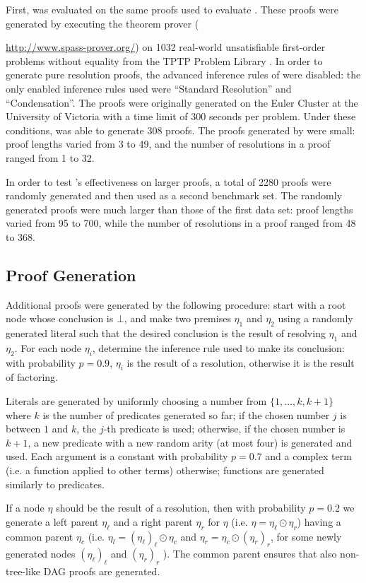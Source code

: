 First, {\FORPI} was evaluated on the same proofs used to evaluate {\GFOLU}. These proofs were generated by executing the {\SPASS} theorem prover ({\url{http://www.spass-prover.org/}) on 1032 real-world unsatisfiable first-order problems without equality from the TPTP Problem Library \cite{TPTP}. In order to generate pure resolution proofs, the advanced inference rules of {\SPASS} were disabled: the only enabled inference rules used were ``Standard Resolution'' and ``Condensation''. The proofs were originally generated on the Euler Cluster at the University of Victoria with a time limit of 300 seconds per problem. Under these conditions, {\SPASS} was able to generate 308 proofs. The proofs generated by {\SPASS} were small: proof lengths varied from 3 to 49, and the number of resolutions in a proof ranged from 1 to 32.



In order to test {\FORPI}'s effectiveness on larger proofs, a total of 2280 proofs were randomly generated and then used as a second benchmark set. The randomly generated proofs were much larger than those of the first data set: proof lengths varied from 95 to 700, while the number of resolutions in a proof ranged from 48 to 368.

\subsection{Proof Generation}
Additional proofs were generated by the following procedure: start with a root node whose conclusion is $\bot$, and make two premises $\eta_1$ and $\eta_2$ using a randomly generated literal such that the desired conclusion is the result of resolving $\eta_1$ and $\eta_2$. For each node $\eta_i$, determine the inference rule used to make its conclusion: with probability $p=0.9$, $\eta_i$ is the result of a resolution, otherwise it is the result of  factoring. 

Literals are generated by uniformly choosing a number from $\{1,\dots,k,k+1\}$ where $k$ is the number of predicates generated so far; if the chosen number $j$ is between $1$ and $k$, the $j$-th predicate is used; otherwise, if the chosen number is $k+1$, a new predicate with a new random arity (at most four) is generated and used. Each argument is a constant with probability $p=0.7$ and a complex term (i.e. a function applied to other terms) otherwise; functions are generated similarly to predicates. 

If a node $\eta$ should be the result of a resolution, then with probability $p=0.2$ we generate a left parent $\eta_\ell$ and a right parent $\eta_r$ for $\eta$ (i.e. $\eta = \eta_\ell \odot \eta_r$) having a common parent $\eta_c$ (i.e. $\eta_l = (\eta_\ell)_\ell \odot \eta_c$ and $\eta_r = \eta_c \odot (\eta_r)_r$, for some newly generated nodes $(\eta_\ell)_\ell$ and $(\eta_r)_r$ ). The common parent ensures that also non-tree-like DAG proofs are generated. 

}
